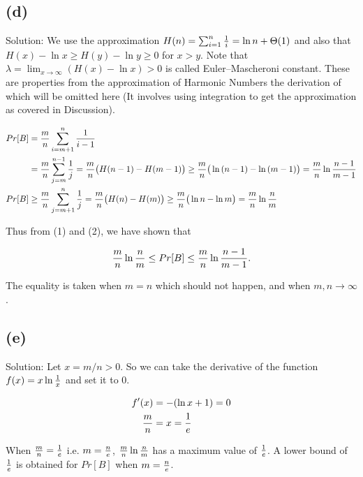 \documentclass[10pt]{537homework}
\begin{document}

\subsection*{(d)}

Solution: We use the approximation $H(n) = \sum_{i=1}^n {1 \over i} = \ln{n} + \Theta(1)$ and also that $H(x) - \ln{x} \geq H(y) - \ln{y} \geq 0$ for $x > y$. Note that $\lambda = \lim_{x \rightarrow \infty}(H(x) - \ln{x}) > 0$ is called Euler–Mascheroni constant. These are properties from the approximation of Harmonic Numbers the derivation of which will be omitted here (It involves using integration to get the approximation as covered in Discussion).  

\begin{align}
  Pr[B]     & = {m \over n}\sum_{i=m+1}^n {1 \over i-1}  \nonumber \\
            & =  {m \over n}\sum_{j=m}^{n-1} {1 \over j} =  {m \over n}\big(H(n-1) - H(m-1)\big) \geq  {m \over n}\big(\ln{(n-1)} - \ln{(m-1)}\big) =  {m \over n}\ln{{n-1 \over m-1}} \\
      Pr[B] & \geq  {m \over n}\sum_{j=m+1}^n {1 \over j} =  {m \over n}\big(H(n) - H(m)\big) \geq  {m \over n}\big(\ln{n} - \ln{m}\big) =  {m \over n}\ln{{n \over m}}
\end{align}

Thus from (1) and (2), we have shown that 

$${m \over n}\ln{{n\over m}} \leq Pr[B] \leq {m\over n}\ln{{n-1 \over m-1}}.$$ 

The equality is taken when $m=n$ which should not happen, and when $m, n \rightarrow \infty$.


\subsection*{(e)}

Solution: Let $x = m/n > 0$. So we can take the derivative of the function $f(x)= x\ln{{1 \over x}}$ and set it to $0$. 

\begin{align*}
  f'(x)       & = -(\ln{x} + 1) = 0 \\
  {m \over n} & = x = {1 \over e}
\end{align*}

When ${m \over n} = {1 \over e}$ i.e. $m = {n \over e}$, ${m \over n} \ln{{n \over m}}$ has a maximum value of ${1 \over e}$. A lower bound of ${1 \over e}$ is obtained for $Pr[B]$ when $m = {n \over e}$. 
\end{document}
